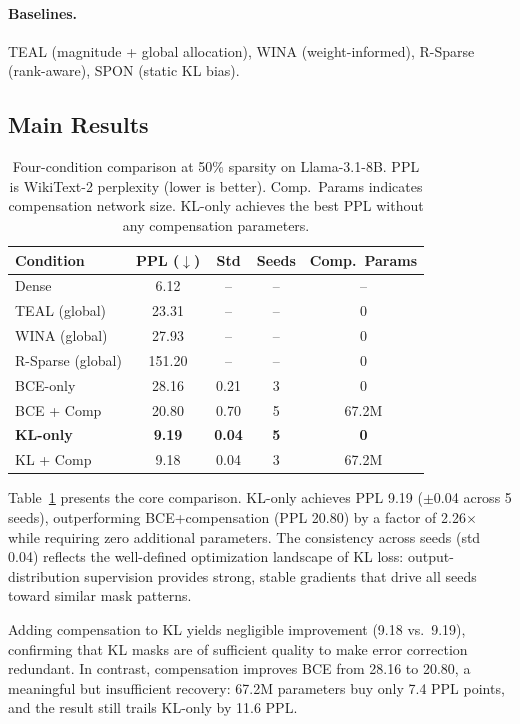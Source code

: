 \documentclass[11pt,a4paper]{article}
\begin{document}
\paragraph{Baselines.} TEAL (magnitude + global allocation), WINA (weight-informed), R-Sparse (rank-aware), SPON (static KL bias).

\subsection{Main Results}
\label{sec:main_results}

\begin{table}[t]
\centering
\caption{Four-condition comparison at 50\% sparsity on Llama-3.1-8B. PPL is WikiText-2 perplexity (lower is better). Comp.\ Params indicates compensation network size. KL-only achieves the best PPL without any compensation parameters.}
\label{tab:main}
\small
\begin{tabular}{lcccc}
\toprule
\textbf{Condition} & \textbf{PPL} ($\downarrow$) & \textbf{Std} & \textbf{Seeds} & \textbf{Comp.\ Params} \\
\midrule
Dense & 6.12 & -- & -- & -- \\
\midrule
TEAL (global) & 23.31 & -- & -- & 0 \\
WINA (global) & 27.93 & -- & -- & 0 \\
R-Sparse (global) & 151.20 & -- & -- & 0 \\
\midrule
BCE-only & 28.16 & 0.21 & 3 & 0 \\
BCE + Comp & 20.80 & 0.70 & 5 & 67.2M \\
\midrule
\textbf{KL-only} & \textbf{9.19} & \textbf{0.04} & \textbf{5} & \textbf{0} \\
KL + Comp & 9.18 & 0.04 & 3 & 67.2M \\
\bottomrule
\end{tabular}
\end{table}

Table~\ref{tab:main} presents the core comparison. KL-only achieves PPL 9.19 ($\pm$0.04 across 5 seeds), outperforming BCE+compensation (PPL 20.80) by a factor of 2.26$\times$ while requiring zero additional parameters. The consistency across seeds (std 0.04) reflects the well-defined optimization landscape of KL loss: output-distribution supervision provides strong, stable gradients that drive all seeds toward similar mask patterns.

Adding compensation to KL yields negligible improvement (9.18 vs.\ 9.19), confirming that KL masks are of sufficient quality to make error correction redundant. In contrast, compensation improves BCE from 28.16 to 20.80, a meaningful but insufficient recovery: 67.2M parameters buy only 7.4 PPL points, and the result still trails KL-only by 11.6 PPL.
\end{document}
